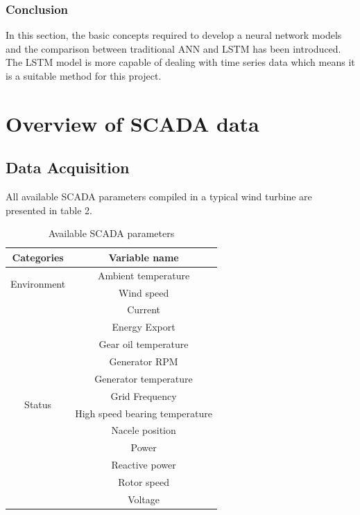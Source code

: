 \subsubsection{Conclusion}

In this section, the basic concepts required to develop a neural network models and the comparison between traditional ANN and LSTM has been introduced. The LSTM model is more capable of dealing with time series data which means it is a suitable method for this project.

\section{Overview of SCADA data}

\subsection{Data Acquisition}
All available SCADA parameters compiled in a typical wind turbine are presented in table 2.

\renewcommand\arraystretch{1.2}
\begin{table}[]
\centering
\begin{tabular}{|c|c|}
\hline
\textbf{Categories}          & \textbf{Variable name}         \\ \hline
\multirow{2}{*}{Environment} & Ambient temperature            \\ \cline{2-2} 
                             & Wind speed                     \\ \hline
\multirow{12}{*}{Status}     & Current                        \\ \cline{2-2} 
                             & Energy Export                  \\ \cline{2-2} 
                             & Gear oil temperature           \\ \cline{2-2} 
                             & Generator RPM                  \\ \cline{2-2} 
                             & Generator temperature          \\ \cline{2-2} 
                             & Grid Frequency                 \\ \cline{2-2} 
                             & High speed bearing temperature \\ \cline{2-2} 
                             & Nacele position                \\ \cline{2-2} 
                             & Power                          \\ \cline{2-2} 
                             & Reactive power                 \\ \cline{2-2} 
                             & Rotor speed                    \\ \cline{2-2} 
                             & Voltage                        \\ \hline
\end{tabular}
\caption{Available SCADA parameters}
\end{table}

